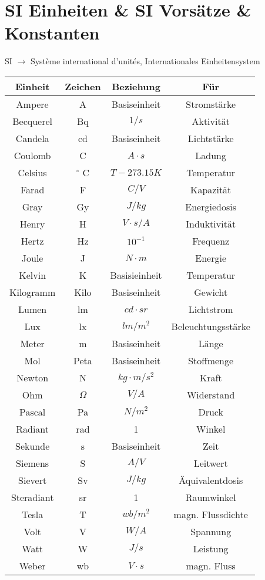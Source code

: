 \section{SI Einheiten \& SI Vorsätze \& Konstanten}
SI $\rightarrow$ Système international d’unités, Internationales Einheitensystem
\setlength{\columnsep}{90pt}
\begin{multicols}{2}	
\renewcommand{\arraystretch}{1.2}		
		\begin{tabular}{|c|c|c|c|}
			\hline \textbf{Einheit} & \textbf{Zeichen} & \textbf{Beziehung} & \textbf{Für}\\
			\hline Ampere 	& A & Basiseinheit & Stromstärke  \\
			\hline Becquerel & Bq &$1/s$ & Aktivität\\
			\hline Candela 	& cd & Basiseinheit & Lichtstärke \\
			\hline Coulomb 	& C & $A\cdot s$ & Ladung \\
			\hline Celsius 	& $^\circ$ C&$T-273.15K$ & Temperatur \\
			\hline Farad & F & $C/V$ & Kapazität \\
			\hline Gray 	& Gy & $J/kg$  &Energiedosis \\
			\hline Henry	& H	& $V \cdot s/A$ & Induktivität\\ 
			\hline Hertz	& Hz	& $10^{-1}$ & Frequenz\\
			\hline Joule	& J 	& $N \cdot m$ & Energie\\
			\hline Kelvin	& K & Basisieinheit & Temperatur \\ 
			\hline Kilogramm	& Kilo	& Basiseinheit & Gewicht\\
			\hline Lumen	& lm	& $cd \cdot sr$  & Lichtstrom\\
			\hline Lux	& lx  & $lm/m^2$ & Beleuchtungsstärke\\
			\hline Meter	& m	& Basiseinheit & Länge \\
			\hline Mol	& Peta	& Basiseinheit & Stoffmenge\\
			\hline Newton 	& N	& $kg \cdot m /s^2$ & Kraft \\
			\hline Ohm	& $\Omega$  & $V/A$ & Widerstand\\
			\hline Pascal	& Pa	& $N/m^2$ & Druck \\
			\hline Radiant	& rad	& 1 & Winkel\\
			\hline Sekunde 	& s	& Basiseinheit & Zeit \\
			\hline Siemens	& S  & $A/V$ &Leitwert\\
			\hline Sievert 	& Sv	& $J/kg$ & Äquivalentdosis \\
			\hline Steradiant	& sr	& 1 & Raumwinkel \\
			\hline Tesla	& T	& $wb/m^2$ & magn. Flussdichte\\
			\hline Volt 	& V	& $W/A$ & Spannung\\			
			\hline Watt	& W  & $J/s$ & Leistung\\
			\hline Weber	& wb	& $V \cdot s$ & magn. Fluss \\
			\hline
		\end{tabular}	
	

\end{multicols}
